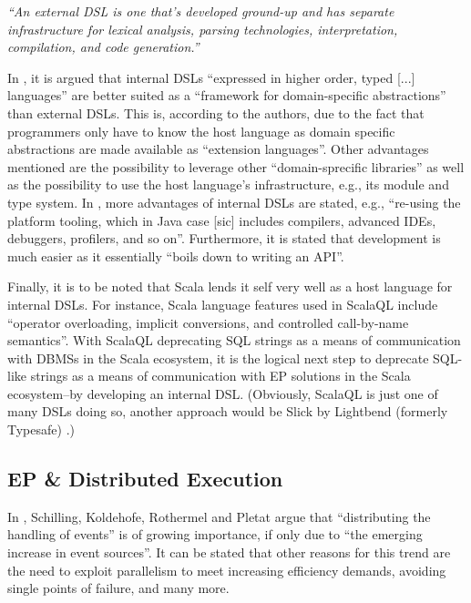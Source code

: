 \documentclass[article, type=bsc, colorback, accentcolor=tud8b, parskip=half, bibliography=totocnumbered]{tudthesis}
\begin{document}
\emph{``An external DSL is one that's developed ground-up and has separate infrastructure for lexical analysis, parsing technologies, interpretation, compilation, and code generation.''}

In \cite{Leijen:1999:DSE:331960.331977}, it is argued that internal DSLs ``expressed in higher order, typed [...] languages'' are better suited as a ``framework for domain-specific abstractions'' than external DSLs.
This is, according to the authors, due to the fact that programmers only have to know the host language as domain specific abstractions are made available as ``extension languages''.
Other advantages mentioned are the possibility to leverage other ``domain-sprecific libraries'' as well as the possibility to use the host language's infrastructure, e.g., its module and type system.
In \cite{Kabanov:2008:ETD:1411732.1411758}, more advantages of internal DSLs are stated, e.g., ``re-using the platform tooling, which in Java case [sic] includes compilers, advanced IDEs, debuggers, profilers, and so on''.
Furthermore, it is stated that development is much easier as it essentially ``boils down to writing an API''.

Finally, it is to be noted that Scala lends it self very well as a host language for internal DSLs.
For instance, Scala language features used in ScalaQL \cite{Spiewak:2009:SLD:2127907.2127923} include ``operator overloading, implicit conversions, and controlled call-by-name semantics''.
With ScalaQL deprecating SQL strings as a means of communication with DBMSs in the Scala ecosystem, it is the logical next step to deprecate SQL-like strings as a means of communication with EP solutions in the Scala ecosystem--by developing an internal DSL.
(Obviously, ScalaQL is just one of many DSLs doing so, another approach would be Slick by Lightbend (formerly Typesafe) \cite{slick}.)

\subsection{EP \& Distributed Execution}
\label{sec:ep_distributed_execution}

In \cite{Schilling:2010:DHE:1827418.1827453}, Schilling, Koldehofe, Rothermel and Pletat argue that ``distributing the handling of events'' is of growing importance, if only due to ``the emerging increase in event sources''.
It can be stated that other reasons for this trend are the need to exploit parallelism to meet increasing efficiency demands, avoiding single points of failure, and many more.
\end{document}
